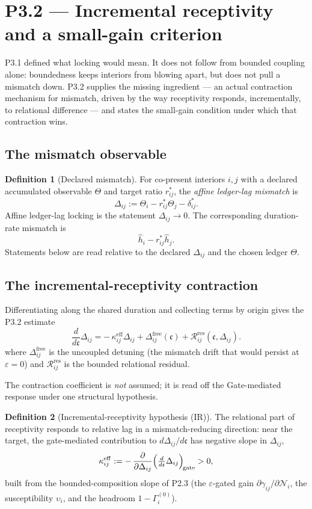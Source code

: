 \documentclass[11pt,a4paper]{article}
\theoremstyle{definition}
\newtheorem{definition}{Definition}[section]
\theoremstyle{plain}
\theoremstyle{remark}
\begin{document}
\section{P3.2 --- Incremental receptivity and a small-gain criterion}

P3.1 defined what locking would mean. It does not follow from bounded coupling alone:
boundedness keeps interiors from blowing apart, but does not pull a mismatch down. P3.2
supplies the missing ingredient --- an actual contraction mechanism for mismatch, driven by
the way receptivity responds, incrementally, to relational difference --- and states the
small-gain condition under which that contraction wins.

\subsection{The mismatch observable}

\begin{definition}[Declared mismatch]\label{def:mismatch}
For co-present interiors \(i,j\) with a declared accumulated observable
\(\Theta\) and target ratio \(r^*_{ij}\), the \emph{affine ledger-lag mismatch} is
\[
\Delta_{ij}
:=
\Theta_i-r^*_{ij}\Theta_j-\delta^*_{ij}.
\]
Affine ledger-lag locking is the statement \(\Delta_{ij}\to0\). The corresponding
duration-rate mismatch is
\[
\hat h_i-r^*_{ij}\hat h_j.
\]
Statements below are read relative to the declared \(\Delta_{ij}\) and the chosen
ledger \(\Theta\).
\end{definition}

\subsection{The incremental-receptivity contraction}

Differentiating along the shared duration and collecting terms by origin gives the P3.2
estimate
\[
\boxed{\;
\frac{d}{d\mathfrak c}\Delta_{ij}
=
-\,\kappa^{\mathrm{eff}}_{ij}\Delta_{ij}
+\Delta^{\mathrm{free}}_{ij}(\mathfrak c)
+\mathcal R^{\mathrm{res}}_{ij}(\mathfrak c,\Delta_{ij}).
\;}
\]
where \(\Delta^{\mathrm{free}}_{ij}\) is the uncoupled detuning (the mismatch drift that would
persist at \(\varepsilon=0\)) and \(\mathcal R^{\mathrm{res}}_{ij}\) is the bounded relational
residual.

The contraction coefficient is \emph{not} assumed; it is read off the Gate-mediated
response under one structural hypothesis.

\begin{definition}[Incremental-receptivity hypothesis (IR)]\label{def:IR}
The relational part of receptivity responds to relative lag in a mismatch-reducing
direction: near the target, the gate-mediated contribution to \(d\Delta_{ij}/d\mathfrak c\)
has negative slope in \(\Delta_{ij}\),
\[
\kappa^{\mathrm{eff}}_{ij}
:=
-\,\frac{\partial}{\partial\Delta_{ij}}
\Bigl(\tfrac{d}{d\mathfrak c}\Delta_{ij}\Bigr)_{\!\mathrm{gate}}
>0,
\]
built from the bounded-composition slope of P2.3 (the \(\varepsilon\)-gated gain
\(\partial\gamma_{ij}/\partial\mathcal N_i\), the susceptibility \(\upsilon_i\), and the
headroom \(1-\Gamma_i^{(0)}\)).
\end{definition}
\end{document}

